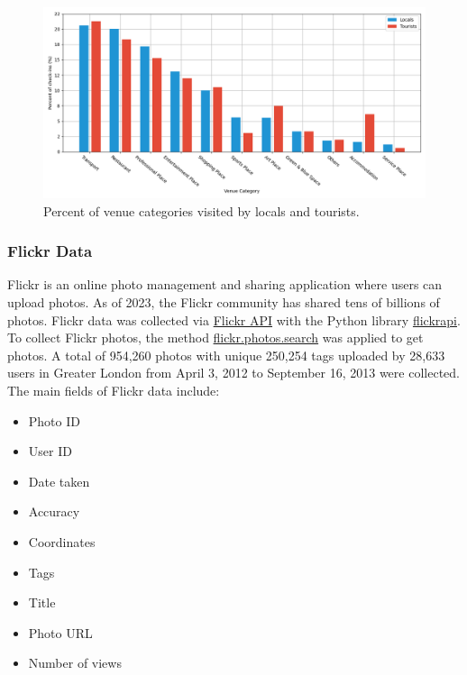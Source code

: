 \documentclass{article}
\begin{document}

\begin{figure}
\centering
\includegraphics[width=1\textwidth]{figures/foursquare_category_percent.png}
\caption{\label{fig:foursquare_category_percent}Percent of venue categories visited by locals and tourists.}
\end{figure}



\subsubsection{Flickr Data}
Flickr is an online photo management and sharing application where users can upload photos. As of 2023, the Flickr community has shared tens of billions of photos. Flickr data was collected via \href{https://www.flickr.com/services/api/}{Flickr API} with the Python library \href{https://stuvel.eu/software/flickrapi/}{flickrapi}. To collect Flickr photos, the method \href{https://www.flickr.com/services/api/flickr.photos.search.html}{flickr.photos.search} was applied to get photos. A total of 954,260 photos with unique 250,254 tags uploaded by 28,633 users in Greater London from April 3, 2012 to September 16, 2013 were collected. The main fields of Flickr data include:
\begin{itemize}
    \item Photo ID
    \item User ID
    \item Date taken
    \item Accuracy
    \item Coordinates
    \item Tags
    \item Title
    \item Photo URL
    \item Number of views
\end{itemize}
\end{document}
